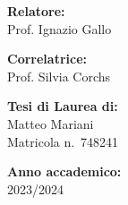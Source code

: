 


\vspace{3cm}
\begin{multicols}{2}
    {
        
        \begin{flushleft}
            \textbf{Relatore:}\\
            Prof. Ignazio Gallo
        \end{flushleft}

        \vspace{0.5cm}
        \begin{flushleft}
            \textbf{Correlatrice:}\\
            Prof. Silvia Corchs
        \end{flushleft}
    }
    {
        \vspace{3cm}
        \begin{flushright}
            \textbf{Tesi di Laurea di:}\\
            Matteo Mariani\\
            Matricola n.\ 748241
        \end{flushright}
    }
\end{multicols}




\vfill

\begin{center}
    \textbf{Anno accademico:}\\
    2023/2024
\end{center}